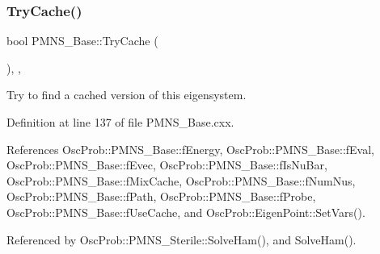 \subsubsection{\texorpdfstring{Try\+Cache()}{TryCache()}}
{\footnotesize\ttfamily bool P\+M\+N\+S\+\_\+\+Base\+::\+Try\+Cache (\begin{DoxyParamCaption}{ }\end{DoxyParamCaption})\hspace{0.3cm}{\ttfamily [protected]}, {\ttfamily [virtual]}, {\ttfamily [inherited]}}

Try to find a cached version of this eigensystem. 

Definition at line 137 of file P\+M\+N\+S\+\_\+\+Base.\+cxx.



References Osc\+Prob\+::\+P\+M\+N\+S\+\_\+\+Base\+::f\+Energy, Osc\+Prob\+::\+P\+M\+N\+S\+\_\+\+Base\+::f\+Eval, Osc\+Prob\+::\+P\+M\+N\+S\+\_\+\+Base\+::f\+Evec, Osc\+Prob\+::\+P\+M\+N\+S\+\_\+\+Base\+::f\+Is\+Nu\+Bar, Osc\+Prob\+::\+P\+M\+N\+S\+\_\+\+Base\+::f\+Mix\+Cache, Osc\+Prob\+::\+P\+M\+N\+S\+\_\+\+Base\+::f\+Num\+Nus, Osc\+Prob\+::\+P\+M\+N\+S\+\_\+\+Base\+::f\+Path, Osc\+Prob\+::\+P\+M\+N\+S\+\_\+\+Base\+::f\+Probe, Osc\+Prob\+::\+P\+M\+N\+S\+\_\+\+Base\+::f\+Use\+Cache, and Osc\+Prob\+::\+Eigen\+Point\+::\+Set\+Vars().



Referenced by Osc\+Prob\+::\+P\+M\+N\+S\+\_\+\+Sterile\+::\+Solve\+Ham(), and Solve\+Ham().


